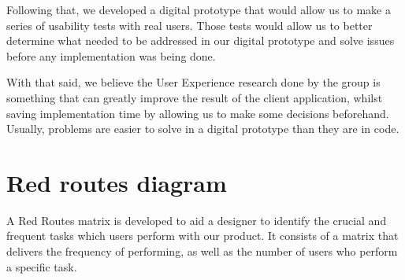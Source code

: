 \documentclass[a4paper,twoside,10pt]{report}
\begin{document}
Following that, we developed a digital prototype that would allow us to make a series of usability tests with real users. Those tests would allow us to better determine what needed to be addressed in our digital prototype and solve issues before any implementation was being done.

With that said, we believe the User Experience research done by the group is something that can greatly improve the result of the client application, whilst saving implementation time by allowing us to make some decisions beforehand. Usually, problems are easier to solve in a digital prototype than they are in code.

\section{Red routes diagram}
A Red Routes matrix is developed to aid a designer to identify the crucial and frequent tasks which users perform with our product. It consists of a matrix that delivers the frequency of performing, as well as the number of users who perform a specific task.
 
\end{document}
